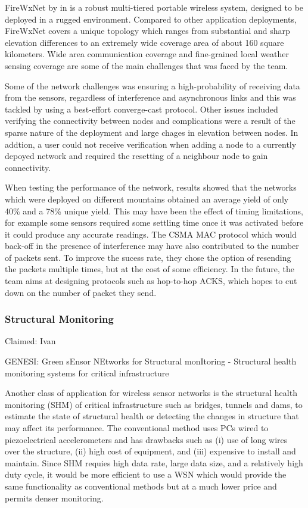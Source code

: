 FireWxNet by \citeauthor{FireWxNet} in \cite{FireWxNet} is a robust multi-tiered portable wireless system, designed to be deployed in a rugged environment. Compared to other application deployments, FireWxNet covers a unique topology which ranges from substantial and sharp elevation differences to an extremely wide coverage area of about 160 square kilometers. Wide area communication coverage and fine-grained local weather sensing coverage are some of the main challenges that was faced by the team. 

Some of the network challenges was ensuring a high-probability of receiving data from the sensors, regardless of interference and asynchronous links and this was tackled by using a best-effort converge-cast protocol. Other issues included verifying the connectivity between nodes and complications were a result of the sparse nature of the deployment and large chages in elevation between nodes. In addtion, a user could not receive verification when adding a node to a currently depoyed network and required the resetting of a neighbour node to gain connectivity.

When testing the performance of the network, results showed that the networks which were deployed on different mountains obtained an average yield of only 40\% and a 78\% unique yield. This may have been the effect of timing limitations, for example some sensors required some settling time once it was activated before it could produce any accurate readings. The CSMA MAC protocol which would back-off in the presence of interference may have also contributed to the number of packets sent. To improve the sucess rate, they chose the option of resending the packets multiple times, but at the cost of some efficiency. In the future, the team aims at designing protocols such as hop-to-hop ACKS, which hopes to cut down on the number of packet they send. 

\subsubsection*{Structural Monitoring}
\cite{5508230} Claimed: Ivan

GENESI: Green sEnsor NEtworks for Structural monItoring - Structural health monitoring systems for critical infrastructure

Another class of application for wireless sensor networks is the structural health monitoring (SHM) of critical infrastructure such as bridges, tunnels and dams, to estimate the state of structural health or detecting the changes in structure that may affect its performance. The conventional method uses PCs wired to piezoelectrical accelerometers and has drawbacks such as (i) use of long wires over the structure, (ii) high cost of equipment, and (iii) expensive to install and maintain. Since SHM requies high data rate, large data size, and a relatively high duty cycle, it would be more efficient to use a WSN which would provide the same functionality as conventional methods but at a much lower price and permits denser monitoring.

